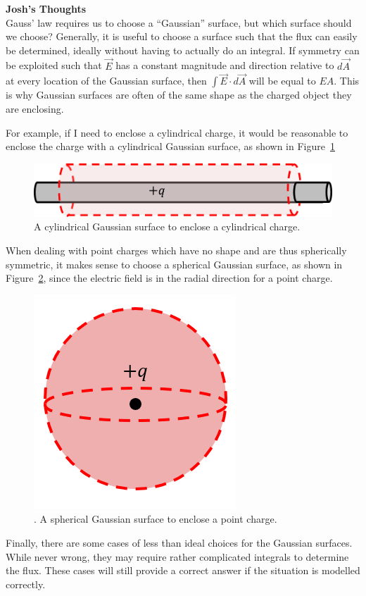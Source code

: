 \begin{framed}
\textbf{Josh's Thoughts}\\
Gauss' law requires us to choose a ``Gaussian'' surface, but which surface should we choose? Generally, it is useful to choose a surface such that the flux can easily be determined, ideally without having to actually do an integral. If symmetry can be exploited such that $\vec E$ has a constant magnitude and direction relative to $d\vec A$ at every location of the Gaussian surface, then $\int \vec E \cdot d\vec A$ will be equal to $E A$. This is why Gaussian surfaces are often of the same shape as the charged object they are enclosing.

For example, if I need to enclose a cylindrical charge, it would be reasonable to enclose the charge with a cylindrical Gaussian surface, as shown in Figure~\ref{fig:gauss:choosecylinder}

\begin{figure}[!htbp]
\centering
\includegraphics[width=0.3\linewidth]{files/choosecylinder-eda869a34c5238cae536651ec6a93e68.png}
\caption[]{A cylindrical Gaussian surface to enclose a cylindrical charge.}
\label{fig:gauss:choosecylinder}
\end{figure}

When dealing with point charges which have no shape and are thus spherically symmetric, it makes sense to choose a spherical Gaussian surface, as shown in Figure~\ref{fig:gauss:choosesphere}, since the electric field is in the radial direction for a point charge.

\begin{figure}[!htbp]
\centering
\includegraphics[width=0.2\linewidth]{files/choosesphere-bfbaa81e8b4c4b6ad75bf006d36063dd.png}
\caption[]{. A spherical Gaussian surface to enclose a point charge.}
\label{fig:gauss:choosesphere}
\end{figure}

Finally, there are some cases of less than ideal choices for the Gaussian surfaces. While never wrong, they may require rather complicated integrals to determine the flux. These cases will still provide a correct answer if the situation is modelled correctly.


\end{framed}
